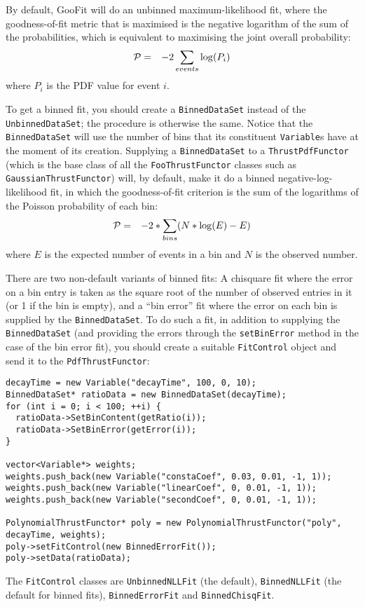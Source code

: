 \documentclass[12pt,pdflatex]{article}
\begin{document}
By default, GooFit will do an unbinned maximum-likelihood fit, where
the goodness-of-fit metric that is maximised is 
the negative logarithm of the sum of the
probabilities, which is equivalent to maximising the joint
overall probability: 
\begin{eqnarray}
{\cal P} &=& -2\sum\limits_{events} \log(P_i)
\end{eqnarray}
where $P_i$ is the PDF value for event $i$. 

To get a binned fit, you should create a \texttt{BinnedDataSet} instead of the
\texttt{UnbinnedDataSet}; the procedure is otherwise the same. Notice that
the \texttt{BinnedDataSet} will use the number of bins that its constituent
\texttt{Variable}s have at the moment of its creation. Supplying a \texttt{BinnedDataSet}
to a \texttt{Thrust\-Pdf\-Functor} (which is the base class of all the \texttt{FooThrustFunctor}
classes such as \texttt{GaussianThrustFunctor}) will, by default, make it
do a binned negative-log-likelihood fit, in which the goodness-of-fit criterion
is the sum of the logarithms of the Poisson probability of each bin:
\begin{eqnarray}
{\cal P} &=& -2*\sum\limits_{bins}(N * \log(E) - E)
\end{eqnarray}
where $E$ is the expected number of events in a bin and $N$ is
the observed number. 

There are two non-default variants of binned fits: A chisquare
fit where the error on a bin entry is taken as the square root
of the number of observed entries in it (or 1 if the bin is empty),
and a ``bin error'' fit where the error on each bin is supplied
by the \texttt{BinnedDataSet}. To do such a fit, in addition to
supplying the \texttt{BinnedDataSet} (and providing the errors
through the \texttt{setBinError} method in the case of the bin error fit),
you should create a suitable \texttt{FitControl} object and send
it to the \texttt{PdfThrustFunctor}:
\begin{verbatim}
decayTime = new Variable("decayTime", 100, 0, 10); 
BinnedDataSet* ratioData = new BinnedDataSet(decayTime); 
for (int i = 0; i < 100; ++i) {
  ratioData->SetBinContent(getRatio(i));
  ratioData->SetBinError(getError(i));
}

vector<Variable*> weights;
weights.push_back(new Variable("constaCoef", 0.03, 0.01, -1, 1));
weights.push_back(new Variable("linearCoef", 0, 0.01, -1, 1));
weights.push_back(new Variable("secondCoef", 0, 0.01, -1, 1));

PolynomialThrustFunctor* poly = new PolynomialThrustFunctor("poly", decayTime, weights); 
poly->setFitControl(new BinnedErrorFit()); 
poly->setData(ratioData); 
\end{verbatim}
The \texttt{FitControl} classes are \texttt{UnbinnedNLLFit} (the default), 
\texttt{BinnedNLLFit} (the default for binned fits), \texttt{BinnedErrorFit}
and \texttt{BinnedChisqFit}. 
\end{document}
